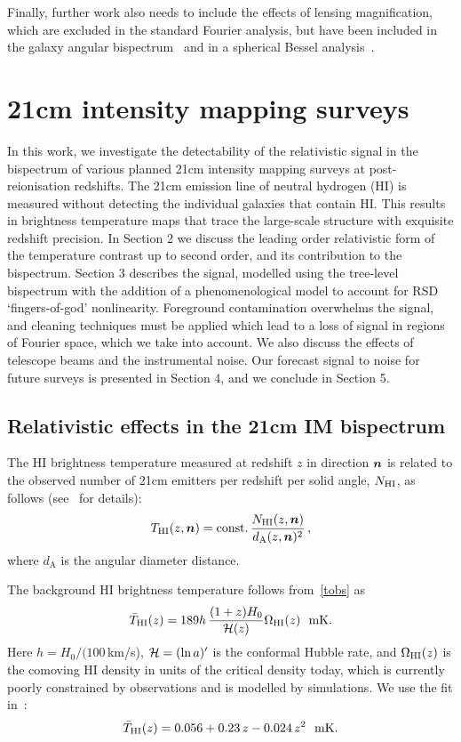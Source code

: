 Finally, further work also needs to include the effects of lensing magnification, which are excluded in the standard Fourier analysis, but have been included in the galaxy angular bispectrum~\cite{Kehagias:2015tda,DiDio:2015bua, DiDio:2016gpd, DiDio:2018unb} and in a spherical Bessel analysis~\cite{Bertacca:2017dzm}. 
%
%
%
%
%
%
%
%
%
%
%
%
\section{21cm intensity mapping surveys}
%
In this work, we investigate the detectability of the relativistic signal in the bispectrum of various planned 21cm intensity mapping surveys at post-reionisation redshifts. 
The 21cm emission line of neutral hydrogen (HI) is measured without detecting the individual galaxies that contain HI. This results in brightness temperature maps that trace the large-scale structure with exquisite redshift precision. In Section 2 we discuss the leading order relativistic form of the temperature contrast up to second order, and its contribution to the bispectrum. Section 3 describes the signal, modelled using the tree-level bispectrum with the addition of a phenomenological model to account for RSD `fingers-of-god' nonlinearity.
Foreground contamination overwhelms the signal, and cleaning techniques must be applied which lead to a loss of signal in regions of Fourier space, which we take into account. We also discuss the effects of telescope beams and the instrumental noise. Our forecast signal to noise for future surveys is presented in Section 4, and we conclude in Section 5.

\subsection{Relativistic effects in the 21cm IM bispectrum}
%
The HI brightness temperature measured at redshift $z$ in direction $\bm {n}$ is related to the observed number of 21cm emitters per redshift per solid angle, $N_{{\mathrm{HI}}}$, as follows (see~\cite{Hall:2012wd,Alonso:2015uua} for details):
\begin{equation}
T_{{\mathrm{HI}}}(z,\bm {n})= \mathrm{const.}\, \frac{ N_{{\mathrm{HI}}}(z,\bm {n})}{d_\mathrm{A}(z,\bm {n})^2}\,,
\label{tobs}
\end{equation}
where $d_\mathrm{A}$ is the angular diameter distance.  

The background HI brightness temperature follows from~\eqref{tobs} as~\cite{Villaescusa-Navarro:2018vsg}
\begin{equation} \label{bart}
\bar{T}_{{\mathrm{HI}}}(z)= 189h\,\frac{(1+z)H_0}{\mathcal{H}(z)}\Omega_{{\mathrm{HI}}}(z)~~\mathrm{mK}.
\end{equation}
Here $h=H_0/(100\,$km/s), $\mathcal{H}=(\ln a)'$ is the conformal Hubble rate, and $\Omega_{{\mathrm{HI}}}(z)$ is the comoving HI density in units of the critical density today, which is currently poorly constrained by observations and is modelled by simulations. We use the fit in~\cite{Santos:2017qgq}:
\begin{equation}
\bar{T}_{{\mathrm{HI}}}(z) = 0.0 56 +0.23\,z -0.024\, z^{2} ~~ \mathrm{mK}. \label{e1.24}
\end{equation}

